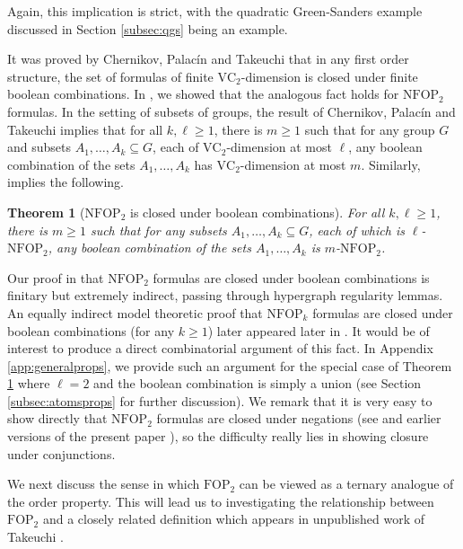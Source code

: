 \documentclass[12pt,oneside,british,a4wide]{amsart}
\newtheorem{theorem}{Theorem}[section]
\numberwithin{equation}{section}
\theoremstyle{definition}
\def\FOP{\mathrm{FOP}}
\def\NFOP{\mathrm{NFOP}}
\def\VC{\mathrm{VC}}
\begin{document}
Again, this implication is strict, with the quadratic Green-Sanders example discussed in Section \ref{subsec:qgs} being an example. 

It was proved by Chernikov, Palac\'{i}n and Takeuchi \cite{Chernikov.2019} that in any first order structure, the set of formulas of finite $\VC_2$-dimension is closed under finite boolean combinations.  In \cite[Corollary D.4]{Terry.2021b}, we showed that the analogous fact holds for $\NFOP_2$ formulas.  In the setting of subsets of groups, the result of Chernikov, Palac\'{i}n and Takeuchi implies that for all $k,\ell\geq 1$, there is $m\geq 1$ such that for any group $G$ and subsets $A_1,\ldots, A_k\subseteq G$, each of $\VC_2$-dimension at most $\ell$, any boolean combination of the sets $A_1,\ldots, A_k$ has $\VC_2$-dimension at most $m$.  Similarly, \cite[Corollary D.5]{Terry.2021b} implies the following.

\begin{theorem}[$\NFOP_2$ is closed under boolean combinations]\label{thm:bool}
For all $k,\ell\geq 1$, there is $m\geq 1$ such that for any subsets $A_1,\ldots, A_k\subseteq G$, each of which is $\ell$-$\NFOP_2$, any boolean combination of the sets $A_1,\ldots, A_k$ is $m$-$\NFOP_2$. 
\end{theorem}

Our proof in \cite{Terry.2021b} that $\NFOP_2$ formulas are closed under boolean combinations is finitary but extremely indirect, passing through hypergraph regularity lemmas.  An equally indirect  model theoretic proof that $\NFOP_k$ formulas are closed under boolean combinations (for any $k\geq 1$) later appeared later in \cite{Abd.2025}. It would be of interest to produce a direct combinatorial argument of this fact. In Appendix \ref{app:generalprops}, we provide such an argument for the special case of Theorem \ref{thm:bool} where $\ell=2$ and the boolean combination is simply a union (see Section \ref{subsec:atomsprops} for further discussion). 
We remark that it is very easy to show directly that $\NFOP_2$ formulas are closed under negations (see \cite{Terry.2021b} and earlier versions of the present paper \cite{Terry.2021av2}), so the difficulty really lies in showing closure under conjunctions. 

We next discuss the sense in which $\FOP_2$ can be viewed as a ternary analogue of the order property. This will lead us to investigating the relationship between $\FOP_2$ and a closely related definition which appears in unpublished work of Takeuchi \cite{Takeuchi.2018}.
\end{document}
